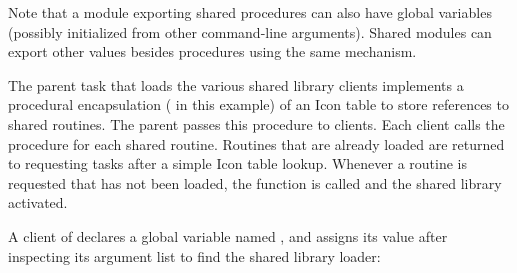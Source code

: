 
Note that a module exporting shared procedures can also have global
variables (possibly initialized from other command-line arguments).
Shared modules can export other values besides procedures using the
same mechanism.

The parent task that loads the various shared library clients implements
a procedural encapsulation ( in
this example) of an Icon table to store references to shared routines.
The parent passes this procedure to clients. Each client calls the
procedure for each shared routine. Routines that are already loaded are
returned to requesting tasks after a simple Icon table lookup. Whenever
a routine is requested that has not been loaded, the
 function is called and the shared
library activated. 


A client of  declares a global
variable named , and assigns its
value after inspecting its argument list to find the shared library
loader: 


